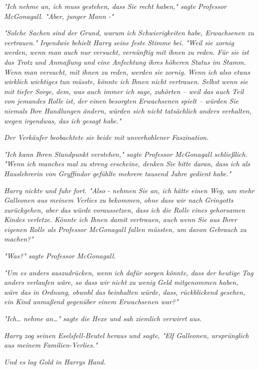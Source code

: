 {\emph{"Ich nehme an, ich muss gestehen, dass Sie recht haben," sagte Professor McGonagall. "Aber, junger Mann -"}

\emph{"Solche Sachen sind der Grund, warum ich Schwierigkeiten habe, Erwachsenen zu vertrauen." Irgendwie behielt Harry seine feste Stimme bei. "Weil sie zornig werden, wenn man auch nur} \emph{\emph{versucht,}} \emph{vernünftig mit ihnen zu reden. Für sie ist das Trotz und Anmaßung und eine Anfechtung ihres höheren Status im Stamm. Wenn man versucht, mit ihnen zu reden, werden sie} \emph{\emph{zornig.}} \emph{Wenn ich also etwas} \emph{\emph{wirklich wichtiges}} \emph{tun müsste, könnte ich Ihnen nicht vertrauen. Selbst wenn sie mit tiefer Sorge, dem, was auch immer ich sage, zuhörten -- weil das auch Teil von jemandes} \emph{\emph{Rolle}} \emph{ist, der einen besorgten Erwachsenen spielt -- würden Sie niemals Ihre Handlungen ändern, würden sich nicht tatsächlich anders verhalten, wegen irgendwas, das ich gesagt habe."}

\emph{Der Verkäufer beobachtete sie beide mit unverhohlener Faszination.}

\emph{"Ich kann Ihren Standpunkt verstehen," sagte Professor McGonagall schließlich. "Wenn ich manches mal zu streng erscheine, denken Sie bitte daran, dass ich als Hauslehrerin von Gryffindor gefühlte mehrere tausend Jahre gedient habe."}

\emph{Harry nickte und fuhr fort. "Also - nehmen Sie an, ich hätte einen Weg, um mehr Galleonen aus meinem Verlies zu bekommen,} \emph{\emph{ohne}} \emph{dass wir nach Gringotts zurückgehen, aber das würde voraussetzen, dass ich die Rolle eines gehorsamen Kindes verletze. Könnte ich Ihnen damit vertrauen, auch wenn Sie aus Ihrer eigenen Rolle als Professor McGonagall fallen müssten, um davon Gebrauch zu machen?"}

\emph{"\emph{Was?}" sagte Professor McGonagall.}

\emph{"Um es anders auszudrücken, wenn ich dafür sorgen könnte, dass der heutige Tag anders verlaufen wäre, so dass wir} \emph{\emph{nicht}} \emph{zu wenig Geld mitgenommen haben, wäre das in Ordnung, obwohl das beinhalten würde, dass, rückblickend gesehen, ein Kind anmaßend gegenüber einem Erwachsenen war?"}

\emph{"Ich… nehme an…" sagte die Hexe und sah ziemlich verwirrt aus.}

\emph{Harry zog seinen Eselsfell-Beutel heraus und sagte, "Elf Galleonen, ursprünglich aus meinem Familien-Verlies."}

\emph{Und es lag Gold in Harrys Hand.}

}
